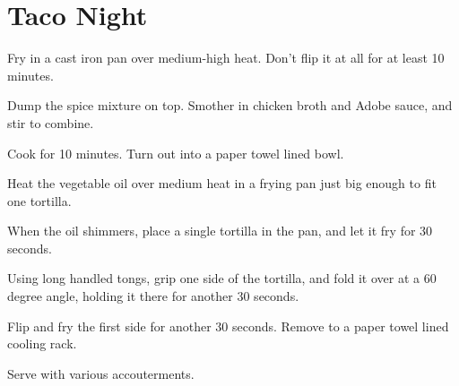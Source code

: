 

\section{Taco Night}
\begin{recipe}



Fry in a cast iron pan over medium-high heat. Don't flip it at all for at least 10 minutes.


Dump the spice mixture on top. Smother in chicken broth and Adobe sauce, and stir to combine.

Cook for 10 minutes. Turn out into a paper towel lined bowl.


Heat the vegetable oil over medium heat in a frying pan just big enough to fit one tortilla.

When the oil shimmers, place a single tortilla in the pan, and let it fry for 30 seconds.

Using long handled tongs, grip one side of the tortilla, and fold it over at a 60 degree angle, holding it there for another 30 seconds.

Flip and fry the first side for another 30 seconds. Remove to a paper towel lined cooling rack.


Serve with various accouterments.


\end{recipe}
